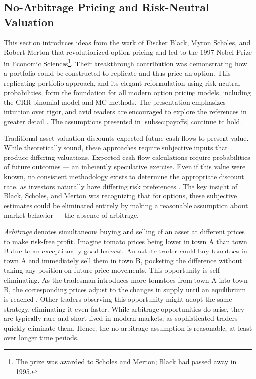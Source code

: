 \documentclass[english,12pt,a4paper,pdftex,sci,utf8]{aaltothesis}
\begin{document}
\subsection{No-Arbitrage Pricing and Risk-Neutral Valuation}\label{sec:risk-neutral-theory}

This section introduces ideas from the work of Fischer Black, Myron Scholes, and Robert Merton that revolutionized option pricing and led to the 1997 Nobel Prize in Economic Sciences\footnote{The prize was awarded to Scholes and Merton; Black had passed away in 1995.}. Their breakthrough contribution was demonstrating how a portfolio could be constructed to replicate and thus price an option. This replicating portfolio approach, and its elegant reformulation using risk-neutral probabilities, form the foundation for all modern option pricing models, including the CRR binomial model and MC methods. The presentation emphasizes intuition over rigor, and avid readers are encouraged to explore the references in greater detail \cite{hull2018, gisiger2010risk, tham2001risk}. The assumptions presented in \cref{subsec:payoffs} continue to hold.

Traditional asset valuation discounts expected future cash flows to present value. While theoretically sound, these approaches require subjective inputs that produce differing valuations. Expected cash flow calculations require probabilities of future outcomes --- an inherently speculative exercise. Even if this value were known, no consistent methodology exists to determine the appropriate discount rate, as investors naturally have differing risk preferences \cite{nobel1997}. The key insight of Black, Scholes, and Merton was recognizing that for options, these subjective estimates could be eliminated entirely by making a reasonable assumption about market behavior --- the absence of arbitrage.

\emph{Arbitrage} denotes simultaneous buying and selling of an asset at different prices to make risk-free profit. Imagine tomato prices being lower in town A than town B due to an exceptionally good harvest. An astute trader could buy tomatoes in town A and immediately sell them in town B, pocketing the difference without taking any position on future price movements. This opportunity is self-eliminating. As the tradesman introduces more tomatoes from town A into town B, the corresponding prices adjust to the changes in supply until an equilibrium is reached \cite{hull2018, wilmott2013paul}. Other traders observing this opportunity might adopt the same strategy, eliminating it even faster. While arbitrage opportunities do arise, they are typically rare and short-lived in modern markets, as sophisticated traders quickly eliminate them. Hence, the no-arbitrage assumption is reasonable, at least over longer time periods.
\end{document}
